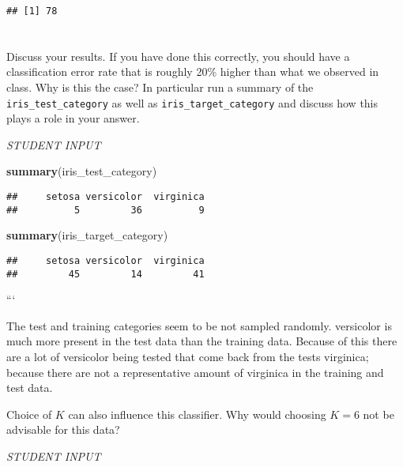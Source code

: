 \documentclass[
]{article}
\newenvironment{Shaded}{\begin{snugshade}}{\end{snugshade}}
\newcommand{\FunctionTok}[1]{\textcolor[rgb]{0.13,0.29,0.53}{\textbf{#1}}}
\newcommand{\NormalTok}[1]{#1}
\begin{document}
\begin{verbatim}
## [1] 78
\end{verbatim}

\hypertarget{section-1}{%
\section{}\label{section-1}}

Discuss your results. If you have done this correctly, you should have a
classification error rate that is roughly 20\% higher than what we
observed in class. Why is this the case? In particular run a summary of
the \texttt{iris\_test\_category} as well as
\texttt{iris\_target\_category} and discuss how this plays a role in
your answer.

\emph{STUDENT INPUT}

\begin{Shaded}
\begin{Highlighting}[]
\FunctionTok{summary}\NormalTok{(iris\_test\_category)}
\end{Highlighting}
\end{Shaded}

\begin{verbatim}
##     setosa versicolor  virginica 
##          5         36          9
\end{verbatim}

\begin{Shaded}
\begin{Highlighting}[]
\FunctionTok{summary}\NormalTok{(iris\_target\_category)}
\end{Highlighting}
\end{Shaded}

\begin{verbatim}
##     setosa versicolor  virginica 
##         45         14         41
\end{verbatim}

```

The test and training categories seem to be not sampled randomly.
versicolor is much more present in the test data than the training data.
Because of this there are a lot of versicolor being tested that come
back from the tests virginica; because there are not a representative
amount of virginica in the training and test data.

Choice of \(K\) can also influence this classifier. Why would choosing
\(K = 6\) not be advisable for this data?

\emph{STUDENT INPUT}
\end{document}
